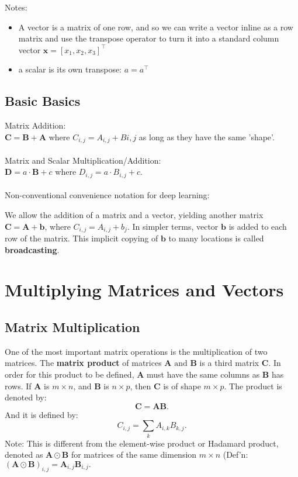 \documentclass[11pt,twocolumn]{report}
\begin{document}
Notes: 
\begin{itemize}
  \item A vector is a matrix of one row, and so we can write a vector inline as
    a row matrix and use the transpose operator to turn it into a standard
    column vector $\bm{x} = [x_1, x_2, x_3]^\intercal$
  \item a scalar is its own transpose: $a = a^\intercal$
\end{itemize}

\subsection{Basic Basics}
Matrix Addition:\\
$\bm{C} = \bm{B} + \bm{A}$ where $C_{i, j} = A_{i, j} + B{i, j}$ as long as
they have the same 'shape'.\\\\
Matrix and Scalar Multiplication/Addition:\\
$\bm{D} = a \cdot \bm{B} + c$ where $D_{i, j} = a \cdot B_{i, j} + c$.\\\\
Non-conventional convenience notation for deep learning:
\begin{flushleft}
  We allow the addition of a matrix and a vector, yielding another matrix 
  $\bm{C} = \bm{A} + \bm{b}$, where $C_{i, j} = A_{i, j} + b_j$. In simpler
  terms, vector $\bm{b}$ is added to each row of the matrix. This implicit
  copying of $\bm{b}$ to many locations is called \textbf{broadcasting}.
\end{flushleft}

\section{Multiplying Matrices and Vectors}
\subsection{Matrix Multiplication}
One of the most important matrix operations is the multiplication of two matrices. The
\textbf{matrix product} of matrices $\bm{A} \text{ and } \bm{B}$ is a third
matrix $\bm{C}$. In order for this product to be defined, $\bm{A}$ must have
the same columns as $\bm{B}$ has rows. If $\bm{A}$ is $m \times n$, and
$\bm{B}$ is $n \times p$, then $\bm{C}$ is of shape $m \times p$.
The product is denoted by:
\begin{equation}
  \bm{C} = \bm{A}\bm{B}.
\end{equation}
And it is defined by:
\begin{equation}
  C_{i, j} = \sum_k A_{i, k}B_{k, j}.
\end{equation}
Note: This is different from the element-wise product or Hadamard product,
denoted as $\bm{A} \odot \bm{B}$ for matrices of the same dimension $m \times
n$ (Def'n: $(\bm{A} \odot \bm{B})_{i, j} = \bm{A}_{i, j}\bm{B}_{i, j}.$
\end{document}
